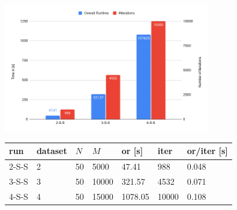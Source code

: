 \documentclass[10pt]{beamer}
\newcommand{\idx}{\varphi}
\newcommand{\varidx}{\psi}
\begin{document}
\begin{frame}
    \begin{figure}
        \includegraphics[width=0.8\textwidth]{pics/chart2.png}
    \end{figure}
    \begin{figure}
        \begin{tabular}{l|lll|lll}
            run & dataset & $N$ & $M$ & {\bf or} [s] & {\bf iter} & {\bf or}/{\bf iter} [s] \\
            \hline
            2-S-S  & 2 & 50 &  5000       & 47.41 & 988 & 0.048      \\   
            3-S-S  & 3 & 50 & 10000       & 321.57 & 4532 & 0.071    \\   
            4-S-S  & 4 & 50 & 15000       & 1078.05 & 10000 & 0.108  \\   
        \end{tabular}
    \end{figure}
\end{frame}

\end{document}

